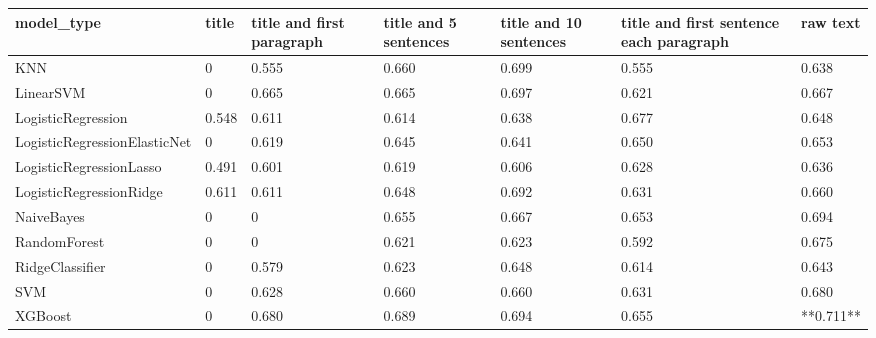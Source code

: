 \begin{tabular}{lllllll}
\toprule
                  model\_type & title & title and first paragraph & title and 5 sentences & title and 10 sentences & title and first sentence each paragraph &  raw text \\
\midrule
                         KNN &     0 &                     0.555 &                 0.660 &                  0.699 &                                   0.555 &     0.638 \\
                   LinearSVM &     0 &                     0.665 &                 0.665 &                  0.697 &                                   0.621 &     0.667 \\
          LogisticRegression & 0.548 &                     0.611 &                 0.614 &                  0.638 &                                   0.677 &     0.648 \\
LogisticRegressionElasticNet &     0 &                     0.619 &                 0.645 &                  0.641 &                                   0.650 &     0.653 \\
     LogisticRegressionLasso & 0.491 &                     0.601 &                 0.619 &                  0.606 &                                   0.628 &     0.636 \\
     LogisticRegressionRidge & 0.611 &                     0.611 &                 0.648 &                  0.692 &                                   0.631 &     0.660 \\
                  NaiveBayes &     0 &                         0 &                 0.655 &                  0.667 &                                   0.653 &     0.694 \\
                RandomForest &     0 &                         0 &                 0.621 &                  0.623 &                                   0.592 &     0.675 \\
             RidgeClassifier &     0 &                     0.579 &                 0.623 &                  0.648 &                                   0.614 &     0.643 \\
                         SVM &     0 &                     0.628 &                 0.660 &                  0.660 &                                   0.631 &     0.680 \\
                     XGBoost &     0 &                     0.680 &                 0.689 &                  0.694 &                                   0.655 & **0.711** \\
\bottomrule
\end{tabular}
